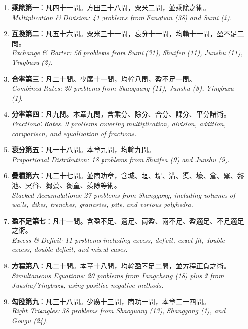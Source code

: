 \documentclass[10pt,a4paper]{article}
\begin{document}
\begin{enumerate}[label=\textbf{\arabic*.},leftmargin=2em]
\item \textbf{乘除第一}：凡四十一問。方田三十八問，粟米二問，並乘除之術。\\
  \textit{Multiplication \& Division: 41 problems from Fangtian (38) and Sumi (2).}

\item \textbf{互換第二}：凡五十六問。粟米三十一問，衰分十一問，均輸十一問，盈不足二問。\\
  \textit{Exchange \& Barter: 56 problems from Sumi (31), Shuifen (11), Junshu (11), Yingbuzu (2).}

\item \textbf{合率第三}：凡二十問。少廣十一問，均輸八問，盈不足一問。\\
  \textit{Combined Rates: 20 problems from Shaoguang (11), Junshu (8), Yingbuzu (1).}

\item \textbf{分率第四}：凡九問。本章九問，含乘分、除分、合分、課分、平分諸術。\\
  \textit{Fractional Rates: 9 problems covering multiplication, division, addition, comparison, and equalization of fractions.}

\item \textbf{衰分第五}：凡一十八問。本章九問，均輸九問。\\
  \textit{Proportional Distribution: 18 problems from Shuifen (9) and Junshu (9).}

\item \textbf{疊積第六}：凡二十七問。並商功章，含城、垣、堤、溝、渠、壕、倉、窯、盤池、冥谷、芻甍、芻童、羨除等術。\\
  \textit{Stacked Accumulations: 27 problems from Shanggong, including volumes of walls, dikes, trenches, granaries, pits, and various polyhedra.}

\item \textbf{盈不足第七}：凡十一問。含盈不足、適足、兩盈、兩不足、盈適足、不足適足之術。\\
  \textit{Excess \& Deficit: 11 problems including excess, deficit, exact fit, double excess, double deficit, and mixed cases.}

\item \textbf{方程第八}：凡二十問。本章十八問，均輸盈不足二問，並方程正負之術。\\
  \textit{Simultaneous Equations: 20 problems from Fangcheng (18) plus 2 from Junshu/Yingbuzu, using positive-negative methods.}

\item \textbf{勾股第九}：凡三十八問。少廣十三問，商功一問，本章二十四問。\\
  \textit{Right Triangles: 38 problems from Shaoguang (13), Shanggong (1), and Gougu (24).}
\end{enumerate}
\end{document}
